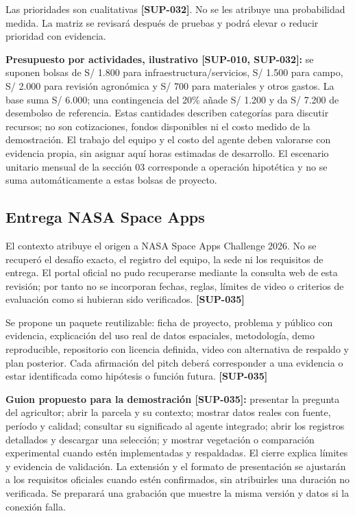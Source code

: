 \documentclass[10pt,a4paper]{article}
\begin{document}
Las prioridades son cualitativas \textbf{[SUP-032]}. No se les atribuye una probabilidad medida. La matriz se revisará después de pruebas y podrá elevar o reducir prioridad con evidencia.


\textbf{Presupuesto por actividades, ilustrativo [SUP-010, SUP-032]:} se suponen bolsas de S/\allowbreak{} 1.800 para infraestructura/\allowbreak{}servicios, S/\allowbreak{} 1.500 para campo, S/\allowbreak{} 2.000 para revisión agronómica y S/\allowbreak{} 700 para materiales y otros gastos. La base suma S/\allowbreak{} 6.000; una contingencia del 20\% añade S/\allowbreak{} 1.200 y da S/\allowbreak{} 7.200 de desembolso de referencia. Estas cantidades describen categorías para discutir recursos; no son cotizaciones, fondos disponibles ni el costo medido de la demostración. El trabajo del equipo y el costo del agente deben valorarse con evidencia propia, sin asignar aquí horas estimadas de desarrollo. El escenario unitario mensual de la sección 03 corresponde a operación hipotética y no se suma automáticamente a estas bolsas de proyecto.


\subsection{Entrega NASA Space Apps}

El contexto atribuye el origen a NASA Space Apps Challenge 2026. No se recuperó el desafío exacto, el registro del equipo, la sede ni los requisitos de entrega. El portal oficial no pudo recuperarse mediante la consulta web de esta revisión; por tanto no se incorporan fechas, reglas, límites de video o criterios de evaluación como si hubieran sido verificados. \textbf{[SUP-035]}


Se propone un paquete reutilizable: ficha de proyecto, problema y público con evidencia, explicación del uso real de datos espaciales, metodología, demo reproducible, repositorio con licencia definida, video con alternativa de respaldo y plan posterior. Cada afirmación del pitch deberá corresponder a una evidencia o estar identificada como hipótesis o función futura. \textbf{[SUP-035]}


\textbf{Guion propuesto para la demostración [SUP-035]:} presentar la pregunta del agricultor; abrir la parcela y su contexto; mostrar datos reales con fuente, período y calidad; consultar su significado al agente integrado; abrir los registros detallados y descargar una selección; y mostrar vegetación o comparación experimental cuando estén implementadas y respaldadas. El cierre explica límites y evidencia de validación. La extensión y el formato de presentación se ajustarán a los requisitos oficiales cuando estén confirmados, sin atribuirles una duración no verificada. Se preparará una grabación que muestre la misma versión y datos si la conexión falla.
\end{document}
